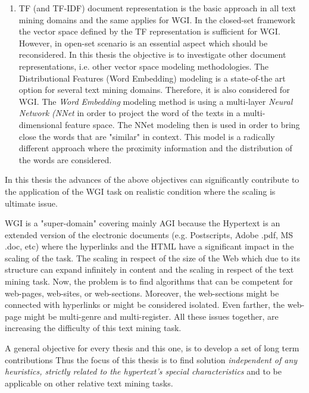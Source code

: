 \begin{enumerate}
\item TF (and TF-IDF) document representation is the basic approach in all text mining domains and the same applies for WGI. In the closed-set framework the vector space defined by the TF representation is sufficient for WGI. However, in open-set scenario is an essential aspect which should be reconsidered. In this thesis the objective is to investigate other document representations, i.e. other vector space modeling methodologies. The Distributional Features (Word Embedding) modeling is a state-of-the art option for several text mining domains. Therefore, it is also considered for WGI. The \textit{Word Embedding} modeling method is using a multi-layer \textit{Neural Network (NNet} in order to project the word of the texts in a multi-dimensional feature space. The NNet modeling then is used in order to bring close the words that are "similar" in context. This model is a radically different approach where the proximity information and the distribution of the words are considered.
\end{enumerate}

In this thesis the advances of the above objectives can significantly contribute to the application of the WGI task on realistic condition where the scaling is ultimate issue.

WGI is a "super-domain" covering mainly AGI because the Hypertext is an extended version of the electronic documents (e.g. Postscripts, Adobe .pdf, MS .doc, etc) where the hyperlinks and the HTML have a significant impact in the scaling of the task. The scaling in respect of the size of the Web which due to its structure can expand infinitely in content and the scaling in respect of the text mining task. Now, the problem is to find algorithms that can be competent for web-pages, web-sites, or web-sections. Moreover, the web-sections might be connected with hyperlinks or might be considered isolated. Even farther, the web-page might be multi-genre and multi-register. All these issues together, are increasing the difficulty of this text mining task.

A general objective for every thesis and this one, is to develop a set of long term contributions Thus the focus of this thesis is to find solution \textit{independent of any heuristics, strictly related to the hypertext's special characteristics} and to be applicable on other relative text mining tasks.
\begin{enumerate}
\end{enumerate}

